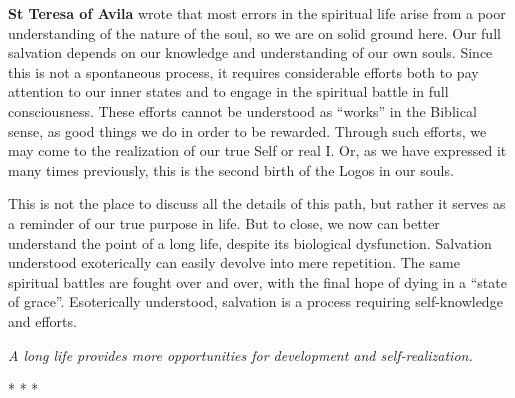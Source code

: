 \textbf{St Teresa of Avila} wrote that most errors in the spiritual life arise from a poor understanding of the nature of the soul, so we are on solid ground here. Our full salvation depends on our knowledge and understanding of our own souls. Since this is not a spontaneous process, it requires considerable efforts both to pay attention to our inner states and to engage in the spiritual battle in full consciousness. These efforts cannot be understood as ``works'' in the Biblical sense, as good things we do in order to be rewarded. Through such efforts, we may come to the realization of our true Self or real I. Or, as we have expressed it many times previously, this is the second birth of the Logos in our souls.

This is not the place to discuss all the details of this path, but rather it serves as a reminder of our true purpose in life. But to close, we now can better understand the point of a long life, despite its biological dysfunction. Salvation understood exoterically can easily devolve into mere repetition. The same spiritual battles are fought over and over, with the final hope of dying in a ``state of grace''. Esoterically understood, salvation is a process requiring self-knowledge and efforts.

\emph{A long life provides more opportunities for development and self-realization.}



\begin{center}* * *\end{center}

